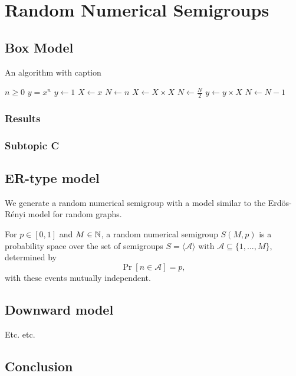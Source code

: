 
\chapter{Random Numerical Semigroups}\label{chap:randnumsems}

\section{Box Model}\label{sec:randomsmpgs:intro}

\begin{algorithm}
\caption{An algorithm with caption}\label{alg:cap}
\begin{algorithmic}
\Require $n \geq 0$
\Ensure $y = x^n$
\State $y \gets 1$
\State $X \gets x$
\State $N \gets n$
    \State $X \gets X \times X$
    \State $N \gets \frac{N}{2}$  
    \State $y \gets y \times X$
    \State $N \gets N - 1$
\EndIf
\EndWhile
\end{algorithmic}
\end{algorithm}

\subsection{Results}\label{sec:contrib1:theme1:B}

\subsection{Subtopic C}\label{sec:contrib1:theme1:C}

\section{ER-type model}

We generate a random numerical semigroup with a model similar to the Erdös-Rényi model for random graphs. 

\begin{definition}
    For $p \in [0, 1]$ and $M \in \mathbb{N}$, a random numerical semigroup $S(M, p)$ is a probability space over the set of semigroups $S = \langle\mathcal{A}\rangle$ with $\mathcal{A} \subseteq \{1,...,M\}$, determined by
    \[\Pr[n \in \mathcal{A}] = p,\]
    with these events mutually independent.
\end{definition}

\section{Downward model}\label{sec:contrib1:theme2}

Etc. etc.



\section{Conclusion}

